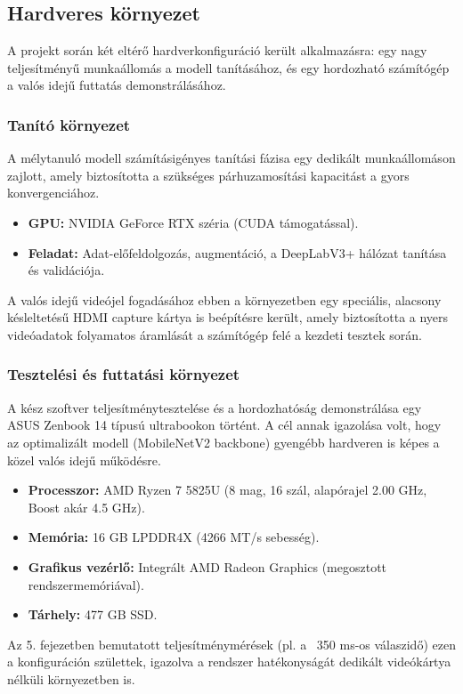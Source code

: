 \documentclass[12pt, a4paper]{report}
\begin{document}
\subsection{Hardveres környezet}
A projekt során két eltérő hardverkonfiguráció került alkalmazásra: egy nagy teljesítményű munkaállomás a modell tanításához, és egy hordozható számítógép a valós idejű futtatás demonstrálásához.

\subsubsection{Tanító környezet}
A mélytanuló modell számításigényes tanítási fázisa egy dedikált munkaállomáson zajlott, amely biztosította a szükséges párhuzamosítási kapacitást a gyors konvergenciához.
\begin{itemize}
    \item \textbf{GPU:} NVIDIA GeForce RTX széria (CUDA támogatással).
    \item \textbf{Feladat:} Adat-előfeldolgozás, augmentáció, a DeepLabV3+ hálózat tanítása és validációja.
\end{itemize}
A valós idejű videójel fogadásához ebben a környezetben egy speciális, alacsony késleltetésű HDMI capture kártya is beépítésre került, amely biztosította a nyers videóadatok folyamatos áramlását a számítógép felé a kezdeti tesztek során.

\subsubsection{Tesztelési és futtatási környezet}
A kész szoftver teljesítménytesztelése és a hordozhatóság demonstrálása egy ASUS Zenbook 14 típusú ultrabookon történt. A cél annak igazolása volt, hogy az optimalizált modell (MobileNetV2 backbone) gyengébb hardveren is képes a közel valós idejű működésre.
\begin{itemize}
    \item \textbf{Processzor:} AMD Ryzen 7 5825U (8 mag, 16 szál, alapórajel 2.00 GHz, Boost akár 4.5 GHz).
    \item \textbf{Memória:} 16 GB LPDDR4X (4266 MT/s sebesség).
    \item \textbf{Grafikus vezérlő:} Integrált AMD Radeon Graphics (megosztott rendszermemóriával).
    \item \textbf{Tárhely:} 477 GB SSD.
\end{itemize}
Az 5. fejezetben bemutatott teljesítménymérések (pl. a ~350 ms-os válaszidő) ezen a konfiguráción születtek, igazolva a rendszer hatékonyságát dedikált videókártya nélküli környezetben is.
\end{document}
